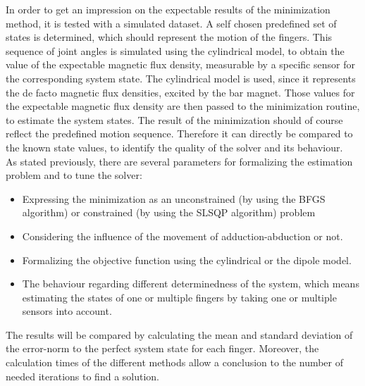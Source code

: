 In order to get an impression on the expectable results of the minimization method, it is tested with a simulated dataset. A self chosen predefined set of states is determined, which should represent the motion of the fingers. This sequence of joint angles is simulated using the cylindrical model, to obtain the value of the expectable magnetic flux density, measurable by a specific sensor for the corresponding system state. The cylindrical model is used, since it represents the de facto magnetic flux densities, excited by the bar magnet. Those values for the expectable magnetic flux density are then passed to the minimization routine, to estimate the system states. The result of the minimization should of course reflect the predefined motion sequence. Therefore it can directly be compared to the known state values, to identify the quality of the solver and its behaviour.\\
As stated previously, there are several parameters for formalizing the estimation problem and to tune the solver:
\begin{itemize}
\item Expressing the minimization as an unconstrained (by using the \ac{BFGS} algorithm) or constrained (by using the \ac{SLSQP} algorithm) problem
\item Considering the influence of the movement of adduction-abduction or not.
\item Formalizing the objective function using the cylindrical or the dipole model.
\item The behaviour regarding different determinedness of the system, which means estimating the states of one or multiple fingers by taking one or multiple sensors into account.
\end{itemize}
The results will be compared by calculating the mean and standard deviation of the error-norm to the perfect system state for each finger. Moreover, the calculation times of the different methods allow a conclusion to the number of needed iterations to find a solution.

